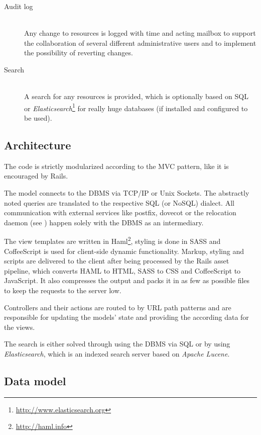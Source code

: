 \documentclass[12pt,a4paper]{scrartcl}
\begin{document}
\begin{description}
				\item[\rm Audit log]\ \\
					Any change to resources is logged with time and acting
					mailbox to support the collaboration of several different
					administrative users and to implement the possibility of
					reverting changes.

				\item[\rm Search]\ \\
					A search for any resources is provided, which is optionally
					based on \ac{SQL} or
					\emph{Elasticsearch}\footnote{\url{http://www.elasticsearch.org}}
					for really huge databases (if installed and configured to
					be used).
			\end{description}

		\subsection{Architecture}

			The code is strictly modularized according to the \ac{MVC} pattern,
			like it is encouraged by \ac{Rails}.
			
			The model connects to the \ac{DBMS} via TCP/IP or Unix Sockets. The
			abstractly noted queries are translated to the respective \ac{SQL}
			(or NoSQL) dialect. All communication with external services like
			postfix, dovecot or the relocation daemon (see
			) happen solely with the
			\ac{DBMS} as an intermediary.

			The view templates are written in
			Haml\footnote{\url{http://haml.info}}, styling is done in SASS and
			CoffeeScript is used for client-side dynamic functionality. Markup,
			styling and scripts are delivered to the client after being
			processed by the \ac{Rails} asset pipeline, which converts HAML to
			HTML, SASS to CSS and CoffeeScript to JavaScript. It also
			compresses the output and packs it in as few as possible files to
			keep the requests to the server low.

			Controllers and their actions are routed to by URL path patterns
			and are responsible for updating the models' state and providing
			the according data for the views.

			The search is either solved through using the \ac{DBMS} via
			\ac{SQL} or by using \emph{Elasticsearch}, which is an indexed
			search server based on \emph{Apache Lucene}.

		\subsection{Data model}
\end{document}
